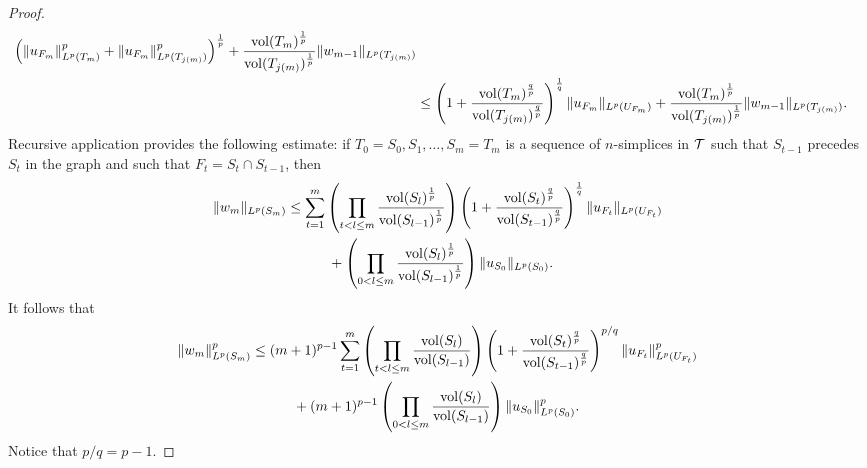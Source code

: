 \documentclass[a4paper]{article}
\begin{document}
\begin{proof}
\begin{align*}
    \left( 
        \| u_{F_m} \|_{L^{p}(T_m)}^{p}
        +
        \| u_{F_{m}} \|_{L^{p}(T_{j(m)})}^{p}
    \right)^{\frac 1 p}
    +
    \frac{ \operatorname{vol}(T_m)^{\frac 1 p} }{ \operatorname{vol}(T_{j(m)})^{\frac 1 p} }
    \| w_{m-1}\|_{L^{p}(T_{j(m)})}
    \\&\leq 
    \left( 1 + \frac{ \operatorname{vol}(T_m)^{\frac q p} }{ \operatorname{vol}(T_{j(m)})^{\frac q p} } \right)^{\frac 1 q}
    \| u_{F_m} \|_{L^{p}(U_{F_m})} 
    +
    \frac{ \operatorname{vol}(T_m)^{\frac 1 p} }{ \operatorname{vol}(T_{j(m)})^{\frac 1 p} }
    \| w_{m-1}\|_{L^{p}(T_{j(m)})}
    .
 \end{align*}
 Recursive application provides the following estimate:
 if $T_0 = S_0, S_1, \dots, S_m = T_m$ is a sequence of $n$-simplices in ${\mathcal T}$
 such that \color{red}$S_{t-1}$ precedes $S_{t}$ in the graph \color{black} and such that $F_t = S_t \cap S_{t-1}$,
 then 
 \begin{align*}
    \| w_{m} \|_{L^{p}(S_m)}
    &\leq 
    \sum_{t=1}^{m} 
    \left( 
        \prod_{t < l \leq m} 
        \frac{ \operatorname{vol}(S_l)^{\frac 1 p} }{ \operatorname{vol}(S_{l-1})^{\frac 1 p} } 
    \right)
    \left( 1 + \frac{ \operatorname{vol}(S_t)^{\frac q p} }{ \operatorname{vol}(S_{t-1})^{\frac q p} } \right)^{\frac 1 q}
    \| u_{F_t} \|_{L^{p}(U_{F_t})}
    \\&\quad \quad \quad 
    +
    \left( 
        \prod_{0 < l \leq m} 
        \frac{ \operatorname{vol}(S_l)^{\frac 1 p} }{ \operatorname{vol}(S_{l-1})^{\frac 1 p} } 
    \right)
    \| u_{S_0}\|_{L^{p}(S_{0})}
    .
 \end{align*}
 It follows that
 \begin{align*}
    \| w_{m} \|_{L^{p}(S_m)}^{p}
    &\leq 
    (m+1)^{p-1}
    \sum_{t=1}^{m} 
    \left( 
        \prod_{t < l \leq m} 
        \frac{ \operatorname{vol}(S_l) }{ \operatorname{vol}(S_{l-1}) } 
    \right)
    \left( 1 + \frac{ \operatorname{vol}(S_t)^{\frac q p} }{ \operatorname{vol}(S_{t-1})^{\frac q p} } \right)^{p/q}
    \| u_{F_t} \|_{L^{p}(U_{F_t})}^{p}
    \\&\quad \quad \quad 
    +
    (m+1)^{p-1}
    \left( 
        \prod_{0 < l \leq m} 
        \frac{ \operatorname{vol}(S_l) }{ \operatorname{vol}(S_{l-1}) } 
    \right)
    \| u_{S_0}\|_{L^{p}(S_{0})}^{p}
    .
 \end{align*}
 Notice that $p/q = p - 1$.
\end{proof}
\end{document}
